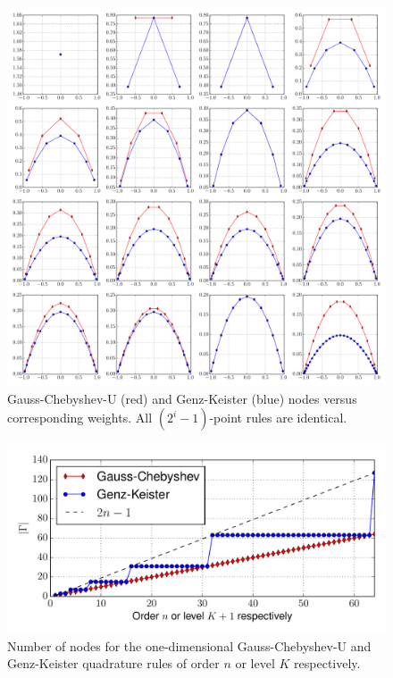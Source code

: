 \documentclass[a4paper,10pt]{article}
\begin{document}
\begin{figure}[h]
  \centering
  \includegraphics[width=\linewidth]{./img/gk_chebyshevu_nodes_1d.pdf}
  \caption{Gauss-Chebyshev-U (red) and Genz-Keister (blue) nodes versus
  corresponding weights. All $(2^i-1)$-point rules are identical.}
  \label{fig:gk_chebyshevu_nodes_1d}
\end{figure}

\begin{figure}
  \centering
  \includegraphics[width=\linewidth]{./img/number_nodes_chebyshevu.pdf}
  \caption{Number of nodes for the one-dimensional Gauss-Chebyshev-U and Genz-Keister quadrature
  rules of order $n$ or level $K$ respectively.}
  \label{fig:number_nodes_chebyshevu}
\end{figure}
\end{document}
